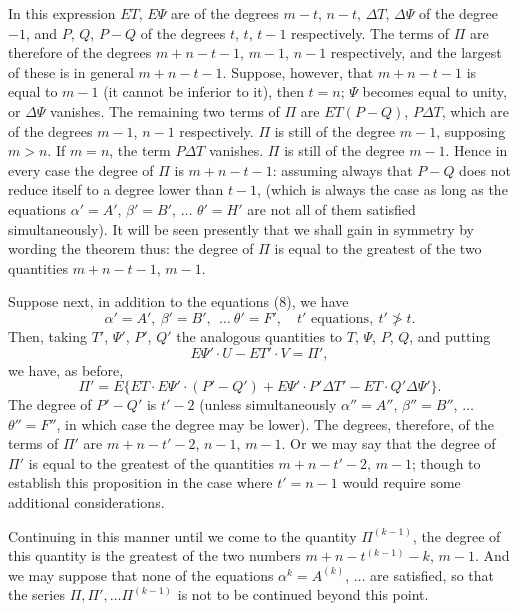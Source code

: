 \documentclass[11pt]{article}
\begin{document}
In this expression $E T$, $E\Psi$ are of the degrees $m - t$, $n - t$, $\Delta T$, $\Delta\Psi$ of the degree $-1$, and $P$, $Q$, $P - Q$ of the degrees $t$, $t$, $t - 1$ respectively. The terms of $\Pi$ are therefore of the degrees $m + n - t - 1$, $m - 1$, $n - 1$ respectively, and the largest of these is in general $m + n - t - 1$. Suppose, however, that $m + n - t - 1$ is equal to $m - 1$ (it cannot be inferior to it), then $t = n$; $\Psi$ becomes equal to unity, or $\Delta\Psi$ vanishes. The remaining two terms of $\Pi$ are $E T (P - Q)$, $P \Delta T$, which are of the degrees $m - 1$, $n - 1$ respectively. $\Pi$ is still of the degree $m - 1$, supposing $m > n$. If $m = n$, the term $P \Delta T$ vanishes. $\Pi$ is still of the degree $m - 1$. Hence in every case the degree of $\Pi$ is $m + n - t - 1$: assuming always that $P - Q$ does not reduce itself to a degree lower than $t - 1$, (which is always the case as long as the equations $\alpha' = A'$, $\beta' = B'$, $\ldots$ $\theta' = H'$ are not all of them satisfied simultaneously). It will be seen presently that we shall gain in symmetry by wording the theorem thus: the degree of $\Pi$ is equal to the greatest of the two quantities $m + n - t - 1$, $m - 1$.

Suppose next, in addition to the equations (8), we have
\[
\alpha' = A',\ \beta' = B',\ \ \ldots\ \theta' = F',\quad t'\text{ equations},\ t' \not> t \tag{8'}.
\]
Then, taking $T'$, $\Psi'$, $P'$, $Q'$ the analogous quantities to $T$, $\Psi$, $P$, $Q$, and putting
\[
E\Psi' \cdot U - E T' \cdot V = \Pi',
\]
we have, as before,
\[
\Pi' = E\{E T \cdot E\Psi' \cdot (P' - Q') + E\Psi' \cdot P'\Delta T' - E T \cdot Q'\Delta\Psi'\}.
\]
The degree of $P' - Q'$ is $t' - 2$ (unless simultaneously $\alpha'' = A''$, $\beta'' = B''$, $\ldots$ $\theta'' = F''$, in which case the degree may be lower). The degrees, therefore, of the terms of $\Pi'$ are $m + n - t' - 2$, $n - 1$, $m - 1$. Or we may say that the degree of $\Pi'$ is equal to the greatest of the quantities $m + n - t' - 2$, $m - 1$; though to establish this proposition in the case where $t' = n - 1$ would require some additional considerations.

Continuing in this manner until we come to the quantity $\Pi^{(k-1)}$, the degree of this quantity is the greatest of the two numbers $m + n - t^{(k-1)} - k$, $m - 1$. And we may suppose that none of the equations $\alpha^k = A^{(k)}$, $\ldots$ are satisfied, so that the series $\Pi, \Pi', \ldots \Pi^{(k-1)}$ is not to be continued beyond this point.
\end{document}
